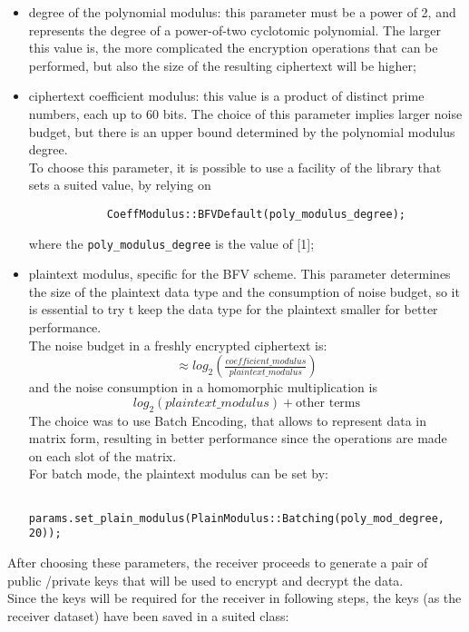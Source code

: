\documentclass[10pt]{extarticle}
\begin{document}
\begin{itemize}
	\item degree of the polynomial modulus: this parameter must be a power of 2, and represents the degree of a power-of-two cyclotomic polynomial. The larger this value is, the more complicated the encryption operations that can be performed, but also the size of the resulting ciphertext will be higher;
	\item ciphertext coefficient modulus: this value is a product of distinct prime numbers, each up to 60 bits. The choice of this parameter implies larger noise budget, but there is an upper bound determined by the polynomial modulus degree.\\
	To choose this parameter, it is possible to use a facility of the library that sets a suited value, by relying on 
		\begin{lstlisting}
			CoeffModulus::BFVDefault(poly_modulus_degree);
		\end{lstlisting}
	where the \texttt{poly\_modulus\_degree} is the value of [1];
	\item plaintext modulus, specific for the BFV scheme. This parameter determines the size of the plaintext data type and the consumption of noise budget, so it is essential to try t keep the data type for the plaintext smaller for better performance.\\The noise budget in a freshly encrypted ciphertext is:
	\begin{equation}
		\approx log_2(\tfrac{coefficient\_modulus}{plaintext\_modulus})
	\end{equation}
	and the noise consumption in a homomorphic multiplication is 
	\begin{equation}
		log_2(plaintext\_modulus) + \text{other terms}
	\end{equation}
	The choice was to use Batch Encoding, that allows to represent data in matrix form, resulting in better performance since the operations are made on each slot of the matrix.\\For batch mode, the plaintext modulus can be set by:
        \begin{lstlisting}
        params.set_plain_modulus(PlainModulus::Batching(poly_mod_degree, 20));
        \end{lstlisting}
\end{itemize}
After choosing these parameters, the receiver proceeds to generate a pair of public /private keys that will be used to encrypt and decrypt the data.\\
Since the keys will be required for the receiver in following steps, the keys (as the receiver dataset) have been saved in a suited class:
\end{document}
